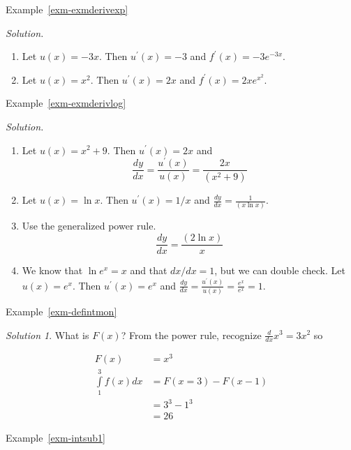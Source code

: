 \documentclass[
  letterpaper,
]{book}
\providecommand{\tightlist}{%
  \setlength{\itemsep}{0pt}\setlength{\parskip}{0pt}}\usepackage{longtable,booktabs,array}
\theoremstyle{definition}
\theoremstyle{definition}
\theoremstyle{plain}
\theoremstyle{definition}
\theoremstyle{plain}
\theoremstyle{plain}
\theoremstyle{remark}
\newtheorem*{solution}{Solution}
\begin{document}
Example~\ref{exm-exmderivexp}

\emph{Solution.}

\begin{enumerate}
\def\labelenumi{\arabic{enumi}.}
\tightlist
\item
  Let \(u(x)=-3x\). Then \(u^\prime(x)=-3\) and
  \(f^\prime(x)=-3e^{-3x}\).
\item
  Let \(u(x)=x^2\). Then \(u^\prime(x)=2x\) and
  \(f^\prime(x)=2xe^{x^2}\).
\end{enumerate}

Example~\ref{exm-exmderivlog}

\emph{Solution.}

\begin{enumerate}
\def\labelenumi{\arabic{enumi}.}
\tightlist
\item
  Let \(u(x)=x^2+9\). Then \(u^\prime(x)=2x\) and
  \[\frac{dy}{dx}= \frac{u^\prime(x)}{u(x)} = \frac{2x}{(x^2+9)}\]
\item
  Let \(u(x)=\ln x\). Then \(u^\prime(x)=1/x\) and
  \(\frac{dy}{dx} = \frac{1}{(x\ln x)}\).
\item
  Use the generalized power rule.
  \[\frac{dy}{dx} = \frac{(2 \ln x)}{x}\]
\item
  We know that \(\ln e^x=x\) and that \(dx/dx=1\), but we can double
  check. Let \(u(x)=e^x\). Then \(u^\prime(x)=e^x\) and
  \(\frac{dy}{dx} = \frac{u^\prime(x)}{u(x)} = \frac{e^x}{e^x} = 1.\)
\end{enumerate}

Example~\ref{exm-defintmon}

\begin{solution}

What is \(F(x)\)? From the power rule, recognize
\(\frac{d}{dx}x^3 = 3x^2\) so

\begin{align*}
F(x) &= x^3\\
\int\limits_1^3 f(x) dx &= F(x = 3) - F(x  - 1)\\
&= 3^3 - 1^3\\
&=26
\end{align*}

\end{solution}

Example~\ref{exm-intsub1}
\end{document}
